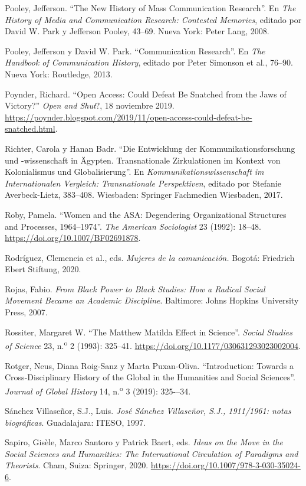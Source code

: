 \documentclass{tufte-handout}
\begin{document}
\begin{hangparas}{.25in}{1}
Pooley, Jefferson. ``The New History of Mass Communication Research''.
En \emph{The History of Media and Communication Research: Contested
Memories}, editado por David W. Park y Jefferson Pooley, 43--69. Nueva
York: Peter Lang, 2008.

Pooley, Jefferson y David W. Park. ``Communication Research''. En
\emph{The Handbook of Communication History}, editado por Peter Simonson
et al., 76--90. Nueva York: Routledge, 2013.

Poynder, Richard. ``Open Access: Could Defeat Be Snatched from the Jaws
of Victory?'' \emph{Open and Shut}?, 18 noviembre 2019.
\href{https://poynder.blogspot.com/2019/11/open-access-could-defeat-be-snatched.html}{https://poynder.blogspot.com/2019/11/open-access-could-defeat-be-snatched.html}.

Richter, Carola y Hanan Badr. ``Die Entwicklung der
Kommunikationsforschung und -wissenschaft in Ägypten. Transnationale
Zirkulationen im Kontext von Kolonialismus und Globalisierung''. En
\emph{Kommunikationswissenschaft im Internationalen Vergleich:
Transnationale Perspektiven}, editado por Stefanie Averbeck-Lietz,
383--408. Wiesbaden: Springer Fachmedien Wiesbaden, 2017.

Roby, Pamela. ``Women and the ASA: Degendering Organizational Structures
and Processes, 1964--1974''. \emph{The American Sociologist} 23 (1992):
18--48. \url{https://doi.org/10.1007/BF02691878}.

Rodríguez, Clemencia et al., eds. \emph{Mujeres de la comunicación.}
Bogotá: Friedrich Ebert Stiftung, 2020.

Rojas, Fabio. \emph{From Black Power to Black Studies: How a Radical
Social Movement Became an Academic Discipline}. Baltimore: Johns Hopkins
University Press, 2007.

Rossiter, Margaret W. ``The Matthew Matilda Effect in Science''.
\emph{Social Studies of Science} 23, n.\textsuperscript{o} 2 (1993):
325--41. \url{https://doi.org/10.1177/030631293023002004}.

Rotger, Neus, Diana Roig-Sanz y Marta Puxan-Oliva. ``Introduction:
Towards a Cross-Disciplinary History of the Global in the Humanities and
Social Sciences''. \emph{Journal of Global History} 14,
n.\textsuperscript{o} 3 (2019): 325-\/--34.

Sánchez Villaseñor, S.J., Luis. \emph{José Sánchez Villaseñor, S.J.,
1911/1961: notas biográficas}. Guadalajara: ITESO, 1997.

Sapiro, Gisèle, Marco Santoro y Patrick Baert, eds. \emph{Ideas on the
Move in the Social Sciences and Humanities: The International
Circulation of Paradigms and Theorists}. Cham, Suiza: Springer, 2020.
\url{https://doi.org/10.1007/978-3-030-35024-6}.


\end{hangparas}
\end{document}
